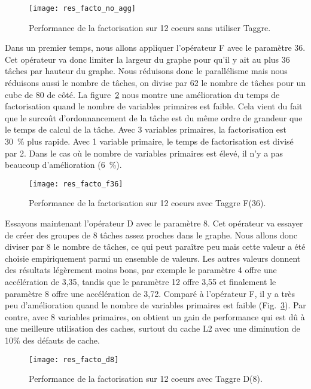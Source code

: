 \begin{figure}[t!]
  \centering
  \texttt{[image: res\_facto\_no\_agg]}
  \caption{Performance de la factorisation sur 12 coeurs sans utiliser Taggre.}
  \label{fig:res_facto_no_agg}
\end{figure}

Dans un premier temps, nous allons appliquer l'opérateur F avec le paramètre 36.
%
Cet opérateur va donc limiter la largeur du graphe pour qu'il y ait au plus 36 tâches par hauteur du graphe.
%
Nous réduisons donc le parallélisme mais nous réduisons aussi le nombre de tâches, on divise par 62 le nombre de tâches pour un cube de 80 de côté.
%
La figure~\ref{fig:res_facto_f36} nous montre une amélioration du temps de factorisation quand le nombre de variables primaires est faible.
%
Cela vient du fait que le surcoût d'ordonnancement de la tâche est du même ordre de grandeur que le temps de calcul de la tâche.
%
Avec 3 variables primaires, la factorisation est 30~\% plus rapide.
%
Avec 1 variable primaire, le temps de factorisation est divisé par 2.
%
Dans le cas où le nombre de variables primaires est élevé, il n'y a pas beaucoup d'amélioration (6~\%).


\begin{figure}[t!]
  \centering
  \texttt{[image: res\_facto\_f36]}
  \caption{Performance de la factorisation sur 12 coeurs avec Taggre F(36).}
  \label{fig:res_facto_f36}
\end{figure}

Essayons maintenant l'opérateur D avec le paramètre 8.
%
Cet opérateur va essayer de créer des groupes de 8 tâches assez proches dans le graphe.
%
Nous allons donc diviser par 8 le nombre de tâches, ce qui peut paraître peu mais cette valeur a été choisie empiriquement parmi un ensemble de valeurs.
%
Les autres valeurs donnent des résultats légèrement moins bons, par exemple le paramètre 4 offre une accélération de 3,35, tandis que le paramètre 12 offre 3,55 et finalement le paramètre 8 offre une accélération de 3,72.
%
Comparé à l'opérateur F, il y a très peu d'amélioration quand le nombre de variables primaires est faible (Fig.~\ref{fig:res_facto_d8}).
%
Par contre, avec 8 variables primaires, on obtient un gain de performance qui est dû à une meilleure utilisation des caches, surtout du cache L2 avec une diminution de 10\% des défauts de cache.

\begin{figure}[t!]
  \centering
  \texttt{[image: res\_facto\_d8]}
  \caption{Performance de la factorisation sur 12 coeurs avec Taggre D(8).}
  \label{fig:res_facto_d8}
\end{figure}

